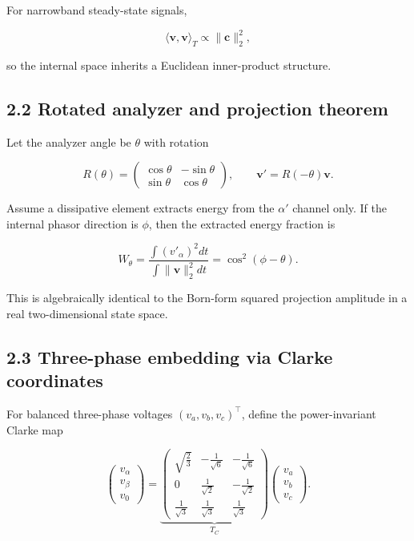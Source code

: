 \documentclass[
  letterpaper,
  DIV=11,
  numbers=noendperiod]{scrartcl}
\begin{document}
For narrowband steady-state signals,

\[
\langle \mathbf v,\mathbf v\rangle_T\propto \|\mathbf c\|_2^2,
\]

so the internal space inherits a Euclidean inner-product structure.

\subsection{2.2 Rotated analyzer and projection
theorem}\label{rotated-analyzer-and-projection-theorem}

Let the analyzer angle be \(\theta\) with rotation

\[
R(\theta)=
\begin{pmatrix}
\cos\theta & -\sin\theta\\
\sin\theta & \cos\theta
\end{pmatrix},
\qquad
\mathbf v' = R(-\theta)\mathbf v.
\]

Assume a dissipative element extracts energy from the \(\alpha'\)
channel only. If the internal phasor direction is \(\phi\), then the
extracted energy fraction is

\[
W_\theta
= \frac{\int (v'_{\alpha})^2 dt}{\int \|\mathbf v\|_2^2 dt}
=\cos^2(\phi-\theta).
\]

This is algebraically identical to the Born-form squared projection
amplitude in a real two-dimensional state space.

\subsection{2.3 Three-phase embedding via Clarke
coordinates}\label{three-phase-embedding-via-clarke-coordinates}

For balanced three-phase voltages \((v_a,v_b,v_c)^\top\), define the
power-invariant Clarke map

\[
\begin{pmatrix}v_\alpha\\v_\beta\\v_0\end{pmatrix}
=
\underbrace{\begin{pmatrix}
\sqrt{\frac23} & -\frac1{\sqrt6} & -\frac1{\sqrt6}\\
0 & \frac1{\sqrt2} & -\frac1{\sqrt2}\\
\frac1{\sqrt3} & \frac1{\sqrt3} & \frac1{\sqrt3}
\end{pmatrix}}_{T_C}
\begin{pmatrix}v_a\\v_b\\v_c\end{pmatrix}.
\]
\end{document}
